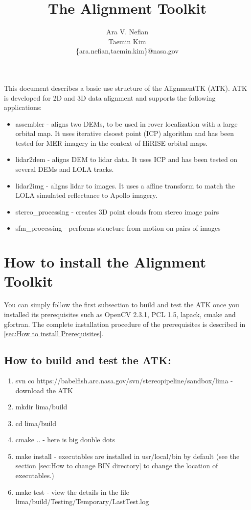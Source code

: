 \documentclass[12pt]{article}
\begin{document}
\title {The Alignment Toolkit}
\author{Ara V. Nefian \\ Taemin Kim\\
\{ara.nefian,taemin.kim\}@nasa.gov}
\maketitle

This document describes a basic use structure of the AlignmentTK (ATK). ATK is developed for 2D and 3D data alignment and supports the following applications:
\begin{itemize}
\item assembler - aligns two DEMs, to be used in rover localization with a large orbital map. It uses iterative clsoest point (ICP) algorithm and has 
been tested for MER imagery in the context of HiRISE orbital maps.
\item lidar2dem - aligns DEM to lidar data. It uses ICP and has been tested on several DEMs and LOLA tracks.
\item lidar2img - aligns lidar to images. It uses a affine transform to match the LOLA simulated reflectance to Apollo imagery.
\item stereo\_processing - creates 3D point clouds from stereo image pairs
\item sfm\_processing - performs structure from motion on pairs of images
\end{itemize} 

\section{How to install the Alignment Toolkit}
You can simply follow the first subsection to build and test the ATK once you installed its prerequisites such as OpenCV 2.3.1, PCL 1.5, lapack, cmake and gfortran. The complete installation procedure of the prerequisites is described in \ref{sec:How to install Prerequisites}.

\subsection{How to build and test the ATK:}
\begin{enumerate}
	\item{svn co  https://babelfish.arc.nasa.gov/svn/stereopipeline/sandbox/lima} - download the ATK
	\item{mkdir lima/build}
	\item{cd lima/build}
	\item{cmake ..} - here is big double dots 
	\item{make install} - executables are installed in usr/local/bin by default (see the section \ref{sec:How to change BIN directory} to change the location of executables.)
	\item{make test} - view the details in the file lima/build/Testing/Temporary/LastTest.log
\end{enumerate}
\end{document}
